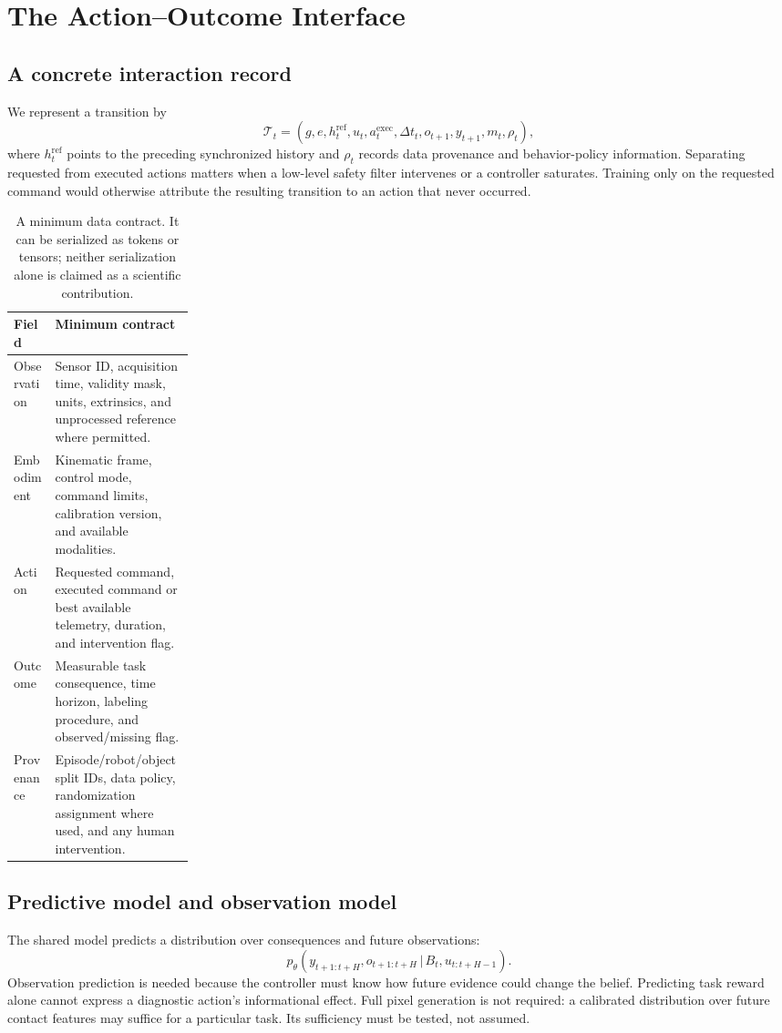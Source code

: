 \documentclass[11pt]{article}
\newcommand{\given}{\,\vert\,}
\begin{document}
\section{The Action--Outcome Interface}
\subsection{A concrete interaction record}
We represent a transition by
\begin{equation}
\mathcal T_t=(g,e,h_t^{\mathrm{ref}},u_t,a_t^{\mathrm{exec}},\Delta t_t,o_{t+1},y_{t+1},m_t,\rho_t),
\end{equation}
where $h_t^{\mathrm{ref}}$ points to the preceding synchronized history and $\rho_t$ records data provenance and behavior-policy information. Separating requested from executed actions matters when a low-level safety filter intervenes or a controller saturates. Training only on the requested command would otherwise attribute the resulting transition to an action that never occurred.

\begin{table}[ht]
\small\centering
\begin{tabularx}{\linewidth}{@{}p{0.23\linewidth}X@{}}
\toprule
Field & Minimum contract \\
\midrule
Observation & Sensor ID, acquisition time, validity mask, units, extrinsics, and unprocessed reference where permitted. \\
Embodiment & Kinematic frame, control mode, command limits, calibration version, and available modalities. \\
Action & Requested command, executed command or best available telemetry, duration, and intervention flag. \\
Outcome & Measurable task consequence, time horizon, labeling procedure, and observed/missing flag. \\
Provenance & Episode/robot/object split IDs, data policy, randomization assignment where used, and any human intervention. \\
\bottomrule
\end{tabularx}
\caption{A minimum data contract. It can be serialized as tokens or tensors; neither serialization alone is claimed as a scientific contribution.}
\end{table}

\subsection{Predictive model and observation model}
The shared model predicts a distribution over consequences and future observations:
\begin{equation}
p_\theta(y_{t+1:t+H},o_{t+1:t+H}\given B_t,u_{t:t+H-1}).
\end{equation}
Observation prediction is needed because the controller must know how future evidence could change the belief. Predicting task reward alone cannot express a diagnostic action's informational effect. Full pixel generation is not required: a calibrated distribution over future contact features may suffice for a particular task. Its sufficiency must be tested, not assumed.
\end{document}

